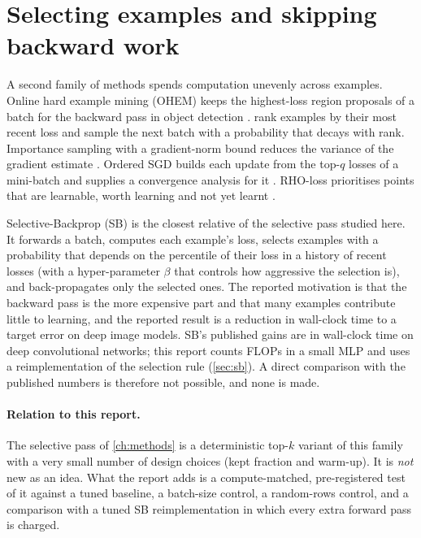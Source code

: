 \section{Selecting examples and skipping backward work}\label{sec:related-selection}
A second family of methods spends computation unevenly across examples. Online hard example mining (OHEM) keeps the highest-loss region proposals of a batch for the backward pass in object detection \citep{shrivastava2016ohem}. \citet{loshchilov2016online} rank examples by their most recent loss and sample the next batch with a probability that decays with rank. Importance sampling with a gradient-norm bound reduces the variance of the gradient estimate \citep{katharopoulos2018not}. Ordered SGD builds each update from the top-$q$ losses of a mini-batch and supplies a convergence analysis for it \citep{kawaguchi2020ordered}. RHO-loss prioritises points that are learnable, worth learning and not yet learnt \citep{mindermann2022prioritized}.

Selective-Backprop (SB) \citep{jiang2019selective} is the closest relative of the selective pass studied here. It forwards a batch, computes each example's loss, selects examples with a probability that depends on the percentile of their loss in a history of recent losses (with a hyper-parameter $\beta$ that controls how aggressive the selection is), and back-propagates only the selected ones. The reported motivation is that the backward pass is the more expensive part and that many examples contribute little to learning, and the reported result is a reduction in wall-clock time to a target error on deep image models. SB's published gains are in wall-clock time on deep convolutional networks; this report counts FLOPs in a small MLP and uses a reimplementation of the selection rule (\cref{sec:sb}). A direct comparison with the published numbers is therefore not possible, and none is made.

\paragraph{Relation to this report.} The selective pass of \cref{ch:methods} is a deterministic top-$k$ variant of this family with a very small number of design choices (kept fraction and warm-up). It is \emph{not} new as an idea. What the report adds is a compute-matched, pre-registered test of it against a tuned baseline, a batch-size control, a random-rows control, and a comparison with a tuned SB reimplementation in which every extra forward pass is charged.


